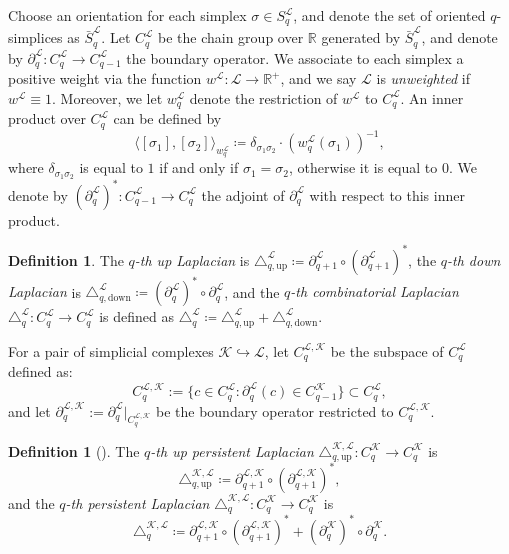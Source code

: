 \documentclass{article}
\theoremstyle{definition}
\newtheorem{definition}[theorem]{Definition}
\newcommand{\KK}{\mathcal{K}}
\newcommand{\LL}{\mathcal{L}}
\begin{document}
Choose an orientation for each simplex $\sigma \in S_q^\LL$,
and denote the set of oriented $q$-simplices as $\bar{S}_q^\LL$.
Let $C_q^\LL$ be the chain group over $\mathbb{R}$ generated by $\bar{S}_q^\LL$,
and denote by $\partial_q^\LL\colon C_q^\LL\to C_{q-1}^\LL$ the boundary operator. We associate to each simplex a positive weight via the function $w^\LL\colon \LL\to \mathbb{R}^+$, and we say $\LL$ is \emph{unweighted} if $w^\LL\equiv 1$. Moreover, we let $w_q^\LL$ denote the restriction of $w^\LL$ to $C_q^\LL$. An inner product over $C_q^\LL$ can be defined by
\[
\langle [\sigma_1], [\sigma_2]\rangle_{w_q^\LL}
\coloneqq
\delta_{\sigma_1\sigma_2}\cdot \left(w_q^\LL(\sigma_1)\right)^{-1},
\]
where $\delta_{\sigma_1\sigma_2}$ is equal to $1$ if and only if $\sigma_1=\sigma_2$,
otherwise it is equal to $0$.
We denote by $\left(\partial_q^\LL\right)^\ast: C_{q-1}^\LL\to C_q^\LL$ the adjoint of $\partial_q^\LL$ with respect to this inner product.

\begin{definition}
\label{total:lap}    
The \emph{$q$-th up Laplacian} is $\triangle^{\LL}_{q,\mathrm{up}}\coloneqq \partial_{q+1}^{\LL}\circ \left(\partial_{q+1}^{\LL}\right)^\ast$,
the \emph{$q$-th down Laplacian} is
$\triangle^{\LL}_{q, \mathrm{down}}\coloneqq
\left(\partial_q^\LL\right)^\ast\circ\partial_q^\LL
$,
and the \emph{$q$-th combinatorial Laplacian} $\triangle_q^\LL: C_q^\LL\to C_q^\LL$ is defined as 
$
 \triangle_q^{\LL}\coloneqq
 \triangle^{\LL}_{q,\mathrm{up}} + 
 \triangle_{q, \mathrm{down}}^\LL.
$
\end{definition}

For a pair of simplicial complexes $\KK\hookrightarrow \LL$, let $C_q^{\LL, \KK}$ be the subspace of $C_q^\LL$ defined as:
\[
C_q^{\LL, \KK}:= \{c\in C_q^\LL: \partial_q^\LL(c)\in C_{q-1}^\KK\}\subset C_q^\LL,
\]
and let $\partial_{q}^{\LL, \KK}:= \partial_q^\LL\Big |_{C_{q}^{\LL, \KK}}$ be the boundary operator restricted to $C_q^{\LL, \KK}$.

\begin{definition}[\cite{pers_lap}]
\label{def:perslap}
The \emph{$q$-th up persistent Laplacian} $\triangle_{q, \mathrm{up}}^{\KK, \LL}: C_q^\KK\to C_q^\KK$ is 
\[
 \triangle_{q, \mathrm{up}}^{\KK, \LL}\coloneqq \partial_{q+1}^{\LL, \KK}\circ \left(\partial_{q+1}^{\LL, \KK}\right)^\ast,
\]
and the \emph{$q$-th persistent Laplacian} $\triangle_{q}^{\KK, \LL}: C_q^\KK\to C_q^\KK$ is
\[
 \triangle_{q}^{\KK, \LL}\coloneqq \partial_{q+1}^{\LL, \KK}\circ \left(\partial_{q+1}^{\LL, \KK}\right)^\ast +
 \left(\partial_q^\KK\right)^\ast \circ \partial_q^\KK.
\]
\end{definition}
\end{document}
